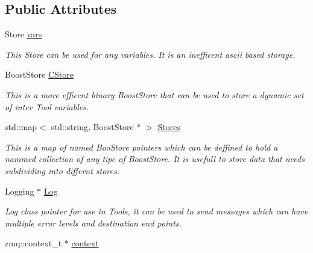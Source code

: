\subsection*{Public Attributes}
\begin{DoxyCompactItemize}
\item 
\hypertarget{classDataModel_a4baac5fe364a7a23762d70d2c2216486}{
Store \hyperlink{classDataModel_a4baac5fe364a7a23762d70d2c2216486}{vars}}
\label{classDataModel_a4baac5fe364a7a23762d70d2c2216486}

\begin{DoxyCompactList}\small\item\em This Store can be used for any variables. It is an inefficent ascii based storage. \item\end{DoxyCompactList}\item 
\hypertarget{classDataModel_a878e0d87285f0b3541a3e7116a5f00b6}{
BoostStore \hyperlink{classDataModel_a878e0d87285f0b3541a3e7116a5f00b6}{CStore}}
\label{classDataModel_a878e0d87285f0b3541a3e7116a5f00b6}

\begin{DoxyCompactList}\small\item\em This is a more efficent binary BoostStore that can be used to store a dynamic set of inter Tool variables. \item\end{DoxyCompactList}\item 
\hypertarget{classDataModel_ad1ffc080c3b263bf3ee382a531321ad4}{
std::map$<$ std::string, BoostStore $\ast$ $>$ \hyperlink{classDataModel_ad1ffc080c3b263bf3ee382a531321ad4}{Stores}}
\label{classDataModel_ad1ffc080c3b263bf3ee382a531321ad4}

\begin{DoxyCompactList}\small\item\em This is a map of named BooStore pointers which can be deffined to hold a nammed collection of any tipe of BoostStore. It is usefull to store data that needs subdividing into differnt stores. \item\end{DoxyCompactList}\item 
\hypertarget{classDataModel_aa777da4c632e4659ee5b1447ad513458}{
Logging $\ast$ \hyperlink{classDataModel_aa777da4c632e4659ee5b1447ad513458}{Log}}
\label{classDataModel_aa777da4c632e4659ee5b1447ad513458}

\begin{DoxyCompactList}\small\item\em Log class pointer for use in Tools, it can be used to send messages which can have multiple error levels and destination end points. \item\end{DoxyCompactList}\item 
\hypertarget{classDataModel_a2c6dfd692e50f90e55338970ea7f8d61}{
zmq::context\_\-t $\ast$ \hyperlink{classDataModel_a2c6dfd692e50f90e55338970ea7f8d61}{context}}
\label{classDataModel_a2c6dfd692e50f90e55338970ea7f8d61}


\end{DoxyCompactItemize}
